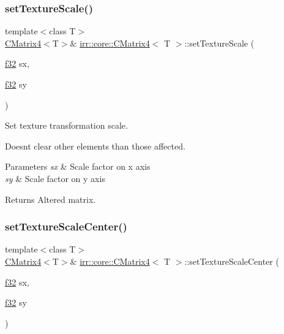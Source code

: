 \subsubsection{\texorpdfstring{set\+Texture\+Scale()}{setTextureScale()}\hspace{0.1cm}{\footnotesize\ttfamily [2/2]}}
{\footnotesize\ttfamily template$<$class T$>$ \\
\hyperlink{classirr_1_1core_1_1CMatrix4}{C\+Matrix4}$<$T$>$\& \hyperlink{classirr_1_1core_1_1CMatrix4}{irr\+::core\+::\+C\+Matrix4}$<$ T $>$\+::set\+Texture\+Scale (\begin{DoxyParamCaption}\item[{\hyperlink{namespaceirr_a0277be98d67dc26ff93b1a6a1d086b07}{f32}}]{sx,  }\item[{\hyperlink{namespaceirr_a0277be98d67dc26ff93b1a6a1d086b07}{f32}}]{sy }\end{DoxyParamCaption})}



Set texture transformation scale. 

Doesn\textquotesingle{}t clear other elements than those affected. 
\begin{DoxyParams}{Parameters}
{\em sx} & Scale factor on x axis \\
\hline
{\em sy} & Scale factor on y axis \\
\hline
\end{DoxyParams}
\begin{DoxyReturn}{Returns}
Altered matrix. 
\end{DoxyReturn}
\mbox{\label{classirr_1_1core_1_1CMatrix4_a0d0eb1cc11d366bf82055f3586c6d80a}} 
\subsubsection{\texorpdfstring{set\+Texture\+Scale\+Center()}{setTextureScaleCenter()}\hspace{0.1cm}{\footnotesize\ttfamily [1/2]}}
{\footnotesize\ttfamily template$<$class T$>$ \\
\hyperlink{classirr_1_1core_1_1CMatrix4}{C\+Matrix4}$<$T$>$\& \hyperlink{classirr_1_1core_1_1CMatrix4}{irr\+::core\+::\+C\+Matrix4}$<$ T $>$\+::set\+Texture\+Scale\+Center (\begin{DoxyParamCaption}\item[{\hyperlink{namespaceirr_a0277be98d67dc26ff93b1a6a1d086b07}{f32}}]{sx,  }\item[{\hyperlink{namespaceirr_a0277be98d67dc26ff93b1a6a1d086b07}{f32}}]{sy }\end{DoxyParamCaption})}



